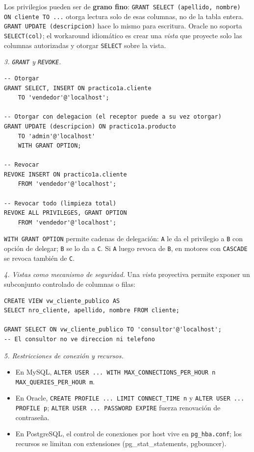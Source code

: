 \documentclass[11pt,a4paper]{article}
\begin{document}
Los privilegios pueden ser de \textbf{grano fino}: \texttt{GRANT SELECT (apellido, nombre) ON cliente TO ...} otorga lectura solo de esas columnas, no de la tabla entera. \texttt{GRANT UPDATE (descripcion)} hace lo mismo para escritura. Oracle no soporta \texttt{SELECT(col)}; el workaround idiomático es crear una \emph{vista} que proyecte solo las columnas autorizadas y otorgar \texttt{SELECT} sobre la vista.

\textit{3. \texttt{GRANT} y \texttt{REVOKE}.}

\begin{lstlisting}
-- Otorgar
GRANT SELECT, INSERT ON practico1a.cliente
    TO 'vendedor'@'localhost';

-- Otorgar con delegacion (el receptor puede a su vez otorgar)
GRANT UPDATE (descripcion) ON practico1a.producto
    TO 'admin'@'localhost'
    WITH GRANT OPTION;

-- Revocar
REVOKE INSERT ON practico1a.cliente
    FROM 'vendedor'@'localhost';

-- Revocar todo (limpieza total)
REVOKE ALL PRIVILEGES, GRANT OPTION
    FROM 'vendedor'@'localhost';
\end{lstlisting}

\texttt{WITH GRANT OPTION} permite cadenas de delegación: \texttt{A} le da el privilegio a \texttt{B} con opción de delegar; \texttt{B} se lo da a \texttt{C}. Si \texttt{A} luego revoca de \texttt{B}, en motores con \texttt{CASCADE} se revoca también de \texttt{C}.

\textit{4. Vistas como mecanismo de seguridad.} Una \emph{vista} proyectiva permite exponer un subconjunto controlado de columnas o filas:

\begin{lstlisting}
CREATE VIEW vw_cliente_publico AS
SELECT nro_cliente, apellido, nombre FROM cliente;

GRANT SELECT ON vw_cliente_publico TO 'consultor'@'localhost';
-- El consultor no ve direccion ni telefono
\end{lstlisting}

\textit{5. Restricciones de conexión y recursos.}

\begin{itemize}
    \item En MySQL, \texttt{ALTER USER ... WITH MAX\_CONNECTIONS\_PER\_HOUR n MAX\_QUERIES\_PER\_HOUR m}.
    \item En Oracle, \texttt{CREATE PROFILE ... LIMIT CONNECT\_TIME n} y \texttt{ALTER USER ... PROFILE p}; \texttt{ALTER USER ... PASSWORD EXPIRE} fuerza renovación de contraseña.
    \item En PostgreSQL, el control de conexiones por host vive en \texttt{pg\_hba.conf}; los recursos se limitan con extensiones (pg\_stat\_statements, pgbouncer).
\end{itemize}
\end{document}
